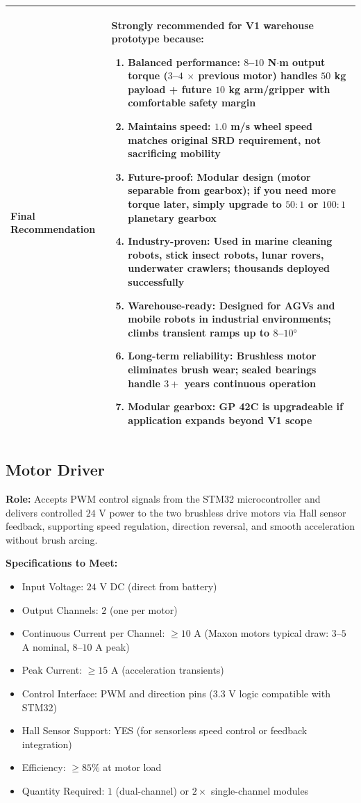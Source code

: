 \documentclass[12pt,a4paper]{article}
\begin{document}
\begin{longtable}{|p{4cm}|p{10cm}|}
Final Recommendation &
\textbf{Strongly recommended} for V1 warehouse prototype because:
\begin{enumerate}
\item \textbf{Balanced performance:} $8$--$10$ N$\cdot$m output torque ($3$--$4$ $\times$ previous motor) handles $50$ kg payload + future $10$ kg arm/gripper with comfortable safety margin
\item \textbf{Maintains speed:} $1.0$ m/s wheel speed matches original SRD requirement, not sacrificing mobility
\item \textbf{Future-proof:} Modular design (motor separable from gearbox); if you need more torque later, simply upgrade to $50:1$ or $100:1$ planetary gearbox
\item \textbf{Industry-proven:} Used in marine cleaning robots, stick insect robots, lunar rovers, underwater crawlers; thousands deployed successfully
\item \textbf{Warehouse-ready:} Designed for AGVs and mobile robots in industrial environments; climbs transient ramps up to $8$--$10°$
\item \textbf{Long-term reliability:} Brushless motor eliminates brush wear; sealed bearings handle $3+$ years continuous operation
\item \textbf{Modular gearbox:} GP 42C is upgradeable if application expands beyond V1 scope
\end{enumerate}
\\
\hline

\end{longtable}



\subsection{Motor Driver}

\textbf{Role:} Accepts PWM control signals from the STM32 microcontroller and delivers controlled $24$ V power to the two brushless drive motors via Hall sensor feedback, supporting speed regulation, direction reversal, and smooth acceleration without brush arcing.

\textbf{Specifications to Meet:}
\begin{itemize}
\item Input Voltage: $24$ V DC (direct from battery)
\item Output Channels: $2$ (one per motor)
\item Continuous Current per Channel: $\geq 10$ A (Maxon motors typical draw: $3$--$5$ A nominal, $8$--$10$ A peak)
\item Peak Current: $\geq 15$ A (acceleration transients)
\item Control Interface: PWM and direction pins ($3.3$ V logic compatible with STM32)
\item Hall Sensor Support: YES (for sensorless speed control or feedback integration)
\item Efficiency: $\geq 85\%$ at motor load
\item Quantity Required: $1$ (dual-channel) or $2 \times$ single-channel modules
\end{itemize}
\end{document}
